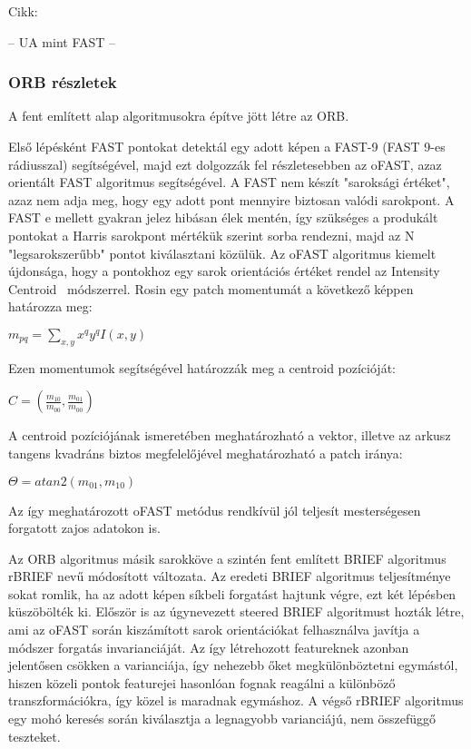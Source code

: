 Cikk:\cite{rublee2011orb}

-- UA mint FAST --

\subsubsection{ORB részletek}

A fent említett alap algoritmusokra építve jött létre az ORB.

Első lépésként FAST pontokat detektál egy adott képen a FAST-9 (FAST 9-es rádiusszal) segítségével, majd ezt dolgozzák fel részletesebben az oFAST, azaz orientált FAST algoritmus segítségével.
A FAST nem készít "saroksági értéket", azaz nem adja meg, hogy egy adott pont mennyire biztosan valódi sarokpont.
A FAST e mellett gyakran jelez hibásan élek mentén, így szükséges a produkált pontokat a Harris sarokpont mértékük szerint sorba rendezni, majd az N "legsarokszerűbb" pontot kiválasztani közülük.
Az oFAST algoritmus kiemelt újdonsága, hogy a pontokhoz egy sarok orientációs értéket rendel az Intensity Centroid~\cite{rosin1999measuring} módszerrel.
Rosin egy patch momentumát a következő képpen határozza meg:

$ m_{pq} = \sum_{x,y}^{}x^{q}y^{q}I(x,y) $

Ezen momentumok segítségével határozzák meg a centroid pozícióját:

$ C = (\frac{m_{10}}{m_{00}},\frac{m_{01}}{m_{00}}) $

A centroid pozíciójának ismeretében meghatározható a vektor, illetve az arkusz tangens kvadráns biztos megfelelőjével meghatározható a patch iránya:

$ \Theta = atan2(m_{01},m_{10}) $

Az így meghatározott oFAST metódus rendkívül jól teljesít mesterségesen forgatott zajos adatokon is.

Az ORB algoritmus másik sarokköve a szintén fent említett BRIEF algoritmus rBRIEF nevű módosított változata.
Az eredeti BRIEF algoritmus teljesítménye sokat romlik, ha az adott képen síkbeli forgatást hajtunk végre, ezt két lépésben küszöbölték ki.
Először is az úgynevezett steered BRIEF algoritmust hozták létre, ami az oFAST során kiszámított sarok orientációkat felhasználva javítja a módszer forgatás invarianciáját.
Az így létrehozott featureknek azonban jelentősen csökken a varianciája, így nehezebb őket megkülönböztetni egymástól, hiszen közeli pontok featurejei hasonlóan fognak reagálni a különböző transzformációkra, így közel is maradnak egymáshoz.
A végső rBRIEF algoritmus egy mohó keresés során kiválasztja a legnagyobb varianciájú, nem összefüggő teszteket.


